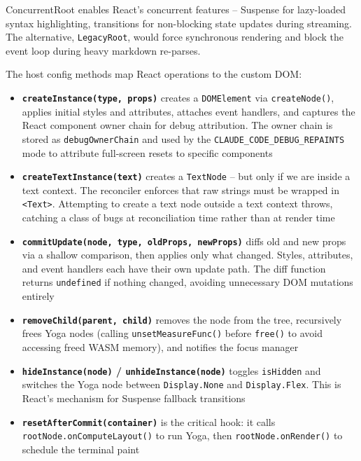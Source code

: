 \documentclass[
  english,
  11pt,
  letterpaper,
]{book}
\providecommand{\tightlist}{%
  \setlength{\itemsep}{0pt}\setlength{\parskip}{0pt}}
\begin{document}
ConcurrentRoot enables React's concurrent features -- Suspense for
lazy-loaded syntax highlighting, transitions for non-blocking state
updates during streaming. The alternative, \texttt{LegacyRoot}, would
force synchronous rendering and block the event loop during heavy
markdown re-parses.

The host config methods map React operations to the custom DOM:

\begin{itemize}
\tightlist
\item
  \textbf{\texttt{createInstance(type,\ props)}} creates a
  \texttt{DOMElement} via \texttt{createNode()}, applies initial styles
  and attributes, attaches event handlers, and captures the React
  component owner chain for debug attribution. The owner chain is stored
  as \texttt{debugOwnerChain} and used by the
  \texttt{CLAUDE\_CODE\_DEBUG\_REPAINTS} mode to attribute full-screen
  resets to specific components
\item
  \textbf{\texttt{createTextInstance(text)}} creates a \texttt{TextNode}
  -- but only if we are inside a text context. The reconciler enforces
  that raw strings must be wrapped in
  \texttt{\textless{}Text\textgreater{}}. Attempting to create a text
  node outside a text context throws, catching a class of bugs at
  reconciliation time rather than at render time
\item
  \textbf{\texttt{commitUpdate(node,\ type,\ oldProps,\ newProps)}}
  diffs old and new props via a shallow comparison, then applies only
  what changed. Styles, attributes, and event handlers each have their
  own update path. The diff function returns \texttt{undefined} if
  nothing changed, avoiding unnecessary DOM mutations entirely
\item
  \textbf{\texttt{removeChild(parent,\ child)}} removes the node from
  the tree, recursively frees Yoga nodes (calling
  \texttt{unsetMeasureFunc()} before \texttt{free()} to avoid accessing
  freed WASM memory), and notifies the focus manager
\item
  \textbf{\texttt{hideInstance(node)} / \texttt{unhideInstance(node)}}
  toggles \texttt{isHidden} and switches the Yoga node between
  \texttt{Display.None} and \texttt{Display.Flex}. This is React's
  mechanism for Suspense fallback transitions
\item
  \textbf{\texttt{resetAfterCommit(container)}} is the critical hook: it
  calls \texttt{rootNode.onComputeLayout()} to run Yoga, then
  \texttt{rootNode.onRender()} to schedule the terminal paint
\end{itemize}
\end{document}
